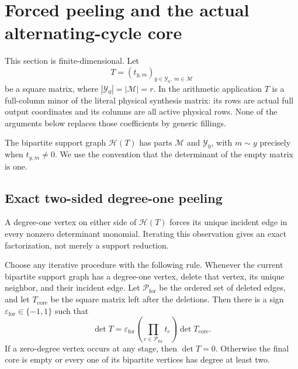 \section{Forced peeling and the actual alternating-cycle core}
\label{sec:tpc67-forced-core}

This section is finite-dimensional.  Let
\[
 T=(t_{y,m})_{y\in\mathcal Y_0,\ m\in\mathcal M}
\]
be a square matrix, where
\(|\mathcal Y_0|=|\mathcal M|=r\).  In the arithmetic application \(T\)
is a full-column minor of the literal physical synthesis matrix: its rows
are actual full output coordinates and its columns are all active physical
rows.  None of the arguments below replaces those coefficients by generic
fillings.

The bipartite support graph \(\mathcal H(T)\) has parts
\(\mathcal M\) and \(\mathcal Y_0\), with \(m\sim y\) precisely when
\(t_{y,m}\ne0\).  We use the convention that the determinant of the empty
matrix is one.

\subsection{Exact two-sided degree-one peeling}

A degree-one vertex on either side of \(\mathcal H(T)\) forces its unique
incident edge in every nonzero determinant monomial.  Iterating this
observation gives an exact factorization, not merely a support reduction.

\begin{theorem}
\label{thm:tpc67-forced-peeling}
Choose any iterative procedure with the following rule.  Whenever the
current bipartite support graph has a degree-one vertex, delete that vertex,
its unique neighbor, and their incident edge.  Let
\(\mathcal P_{\mathrm{for}}\) be the ordered set of deleted edges, and let
\(T_{\mathrm{core}}\) be the square matrix left after the deletions.
Then there is a sign
\(\varepsilon_{\mathrm{for}}\in\{-1,1\}\) such that
\begin{equation}
 \boxed{
 \det T
 =
 \varepsilon_{\mathrm{for}}
 \left(\prod_{e\in\mathcal P_{\mathrm{for}}}t_e\right)
 \det T_{\mathrm{core}}.}
 \label{eq:tpc67-forced-factorization}
\end{equation}
If a zero-degree vertex occurs at any stage, then
\(\det T=0\).  Otherwise the final core is empty or every one of its
bipartite vertices has degree at least two.
\end{theorem}

